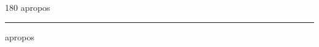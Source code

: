 
\begin{frame}
\begin{center}
\begin{turn}{180}
{\fontsize{2.5cm}{1em}\selectfont apropos}
\end{turn}
\vspace{1em}\par  
\hrule
\vspace{1em}\par  
{\fontsize{2.5cm}{1em}\selectfont apropos}
\end{center}
\end{frame}
